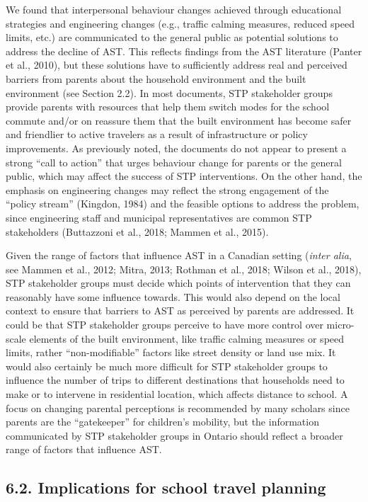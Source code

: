 \documentclass[]{elsarticle} %
\begin{document}
We found that interpersonal behaviour changes achieved through
educational strategies and engineering changes (e.g., traffic calming
measures, reduced speed limits, etc.) are communicated to the general
public as potential solutions to address the decline of AST. This
reflects findings from the AST literature (Panter et al., 2010), but
these solutions have to sufficiently address real and perceived barriers
from parents about the household environment and the built environment
(see Section 2.2). In most documents, STP stakeholder groups provide
parents with resources that help them switch modes for the school
commute and/or on reassure them that the built environment has become
safer and friendlier to active travelers as a result of infrastructure
or policy improvements. As previously noted, the documents do not appear
to present a strong ``call to action'' that urges behaviour change for
parents or the general public, which may affect the success of STP
interventions. On the other hand, the emphasis on engineering changes
may reflect the strong engagement of the ``policy stream'' (Kingdon,
1984) and the feasible options to address the problem, since engineering
staff and municipal representatives are common STP stakeholders
(Buttazzoni et al., 2018; Mammen et al., 2015).

Given the range of factors that influence AST in a Canadian setting
(\emph{inter alia}, see Mammen et al., 2012; Mitra, 2013; Rothman et
al., 2018; Wilson et al., 2018), STP stakeholder groups must decide
which points of intervention that they can reasonably have some
influence towards. This would also depend on the local context to ensure
that barriers to AST as perceived by parents are addressed. It could be
that STP stakeholder groups perceive to have more control over
micro-scale elements of the built environment, like traffic calming
measures or speed limits, rather ``non-modifiable'' factors like street
density or land use mix. It would also certainly be much more difficult
for STP stakeholder groups to influence the number of trips to different
destinations that households need to make or to intervene in residential
location, which affects distance to school. A focus on changing parental
perceptions is recommended by many scholars since parents are the
``gatekeeper'' for children's mobility, but the information communicated
by STP stakeholder groups in Ontario should reflect a broader range of
factors that influence AST.

\hypertarget{implications-for-school-travel-planning}{%
\subsection{6.2. Implications for school travel
planning}\label{implications-for-school-travel-planning}}
\end{document}
